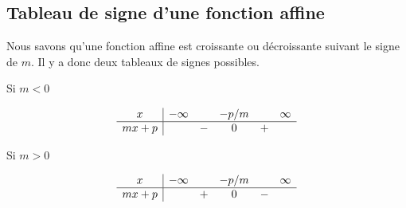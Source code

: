 \subsection{Tableau de signe d'une fonction affine}

Nous savons qu'une fonction affine est croissante ou décroissante suivant le signe de \( m\). Il y a donc deux tableaux de signes possibles.

\begin{minipage}{0.485\textwidth}
    \begin{center}

        Si \( m<0\)
        \vspace{5mm}

                  

               \begin{equation*}
                   \begin{array}[]{c|ccccc}
                        x&-\infty&&-p/m&&\infty\\
                         \hline
                         mx+p&&-&0&+&\\ 
                          \end{array}
                      \end{equation*}
    \end{center}
\end{minipage}
\hspace{1mm}
\begin{minipage}{0.485\textwidth}
    \begin{center}
        Si \( m>0\)
        \vspace{5mm}

                    

               \begin{equation*}
                   \begin{array}[]{c|ccccc}
                        x&-\infty&&-p/m&&\infty\\
                         \hline
                         mx+p&&+&0&-&\\ 
                          \end{array}
                      \end{equation*}
    \end{center}
\end{minipage}

